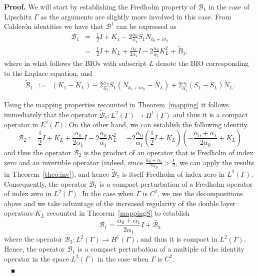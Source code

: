 \documentclass[11pt]{article}
\numberwithin{equation}{section}
\newenvironment{proof}{\hspace{0.5cm} {\bf Proof.}}
{$\quad {}_\blacksquare$\vspace{0.3cm}}
\begin{document}
\begin{proof}
  We will start by establishing the Fredholm property of $\mathcal{B}_1$ in the case of Lipschitz $\Gamma$ as the arguments are slightly more involved in this case. From Calder\'on identities we have that $\mathcal B^1$ can be expressed as 
 \begin{eqnarray*}
    \mathcal{B}_1&=&\frac{1}{2}I+K_1-2\frac{\alpha_0}{\alpha_1}S_1N_{k_0+i\sigma_0}\\
    &=&\frac{1}{2}I+K_L+\frac{\alpha_0}{2\alpha_1}I-2\frac{\alpha_0}{\alpha_1}K^2_L+\widetilde{B}_1,
  \end{eqnarray*}
where in what follows the BIOs with subscript $L$ denote the BIO corresponding to the Laplace equation, and
 \begin{eqnarray*}
    \widetilde{\mathcal{B}}_1&:=&(K_1-K_L)-2\frac{\alpha_0}{\alpha_1}S_1(N_{k_0+i\sigma_0}-N_L)+2\frac{\alpha_0}{\alpha_1}(S_1-S_L)N_L.
  \end{eqnarray*}
  
  Using the mapping properties recounted in Theorem~\ref{mapping} it follows immediately that the operator $\widetilde{\mathcal{B}}_1:L^2(\Gamma)\to H^1(\Gamma)$ and thus it is a compact operator in $L^2(\Gamma)$. On the other hand, we can establish the following identity
  \[
  \widetilde{\mathcal{B}}_2:=\frac{1}{2}I+K_L+\frac{\alpha_0}{2\alpha_1}I-2\frac{\alpha_0}{\alpha_1}K^2_L=-2\frac{\alpha_0}{\alpha_1}\left(\frac{1}{2}I+K_L\right)\left(-\frac{\alpha_0+\alpha_1}{2\alpha_0}+K_L\right)
  \]
  and thus the operator $\widetilde{\mathcal{B}}_2$ is the product of an operator that is Fredholm of index zero and an invertible operator (indeed, since $\frac{\alpha_0+\alpha_1}{2\alpha_0}>\frac{1}{2}$, we can apply the results in Theorem~\ref{theo:inv}), and hence $\widetilde{\mathcal{B}}_2$ is itself Fredholm of index zero in $L^2(\Gamma)$. Consequently, the operator $\mathcal{B}_1$ is a compact perturbation of a Fredholm operator of index zero in $L^2(\Gamma)$. In the case when $\Gamma$ is $C^2$, we use the decompositions above and we take advantage of the increased regularity of the double layer operators $K_L$ recounted in Theorem~\ref{mappingS} to establish
  \begin{equation}
    \mathcal{B}_1=\frac{\alpha_0+\alpha_1}{2\alpha_1}I+\widetilde{\mathcal{B}_3}
    \end{equation}
where the operator $\widetilde{\mathcal{B}}_3:L^2(\Gamma)\to H^1(\Gamma)$, and thus it is compact in $L^2(\Gamma)$. Hence, the operator $\mathcal{B}_1$ is a compact perturbation of a multiple of the identity operator in the space $L^2(\Gamma)$ in the case when $\Gamma$ is $C^2$. 


\end{proof}
\end{document}
